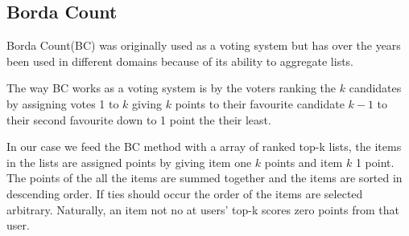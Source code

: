 \subsection{Borda Count}\label{sec:bordacount}
Borda Count(BC) was originally used as a voting system but has over the years been used in different domains because of its ability to aggregate lists.

The way BC works as a voting system is by the voters ranking the $k$ candidates by assigning votes 1 to $k$ giving $k$ points to their favourite candidate $k-1$ to their second favourite down to 1 point the their least.

In our case we feed the BC method with a array of ranked top-k lists, the items in the lists are assigned points by giving item one $k$ points and item $k$ 1 point\cite{ourreport}. The points of the all the items are summed together and the items are sorted in descending order. If ties should occur the order of the items are selected arbitrary. Naturally, an item not no at users' top-k scores zero points from that user.


